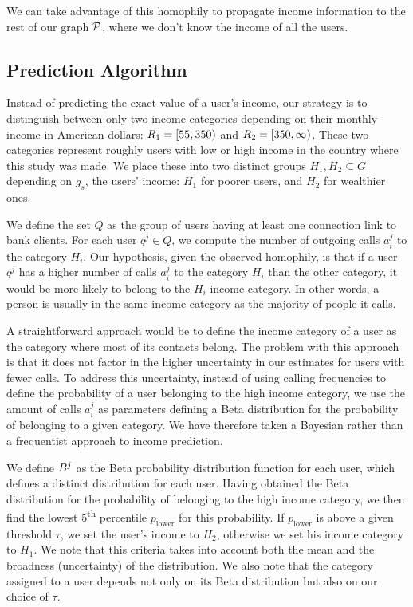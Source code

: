 We can take advantage of this homophily to propagate income information to the rest of our graph $\mathcal{P}$, where we don't know the income of all the users.

\subsection{Prediction Algorithm}

Instead of predicting the exact value of a user's income, our strategy is to distinguish between only two income categories depending on their monthly income in American dollars: $R_1 = \left[ 55, 350 \right)$ and $R_2 = \left[ 350, \infty \right)$. These two categories represent roughly users with low or high income in the country where this study was made. We place these into two distinct groups $H_1, H_2 \subseteq G$ depending on $g_s$, the users' income: $H_1$ for poorer users, and $H_2$ for wealthier ones.

We define the set $Q$ as the group of users having at least one connection link to bank clients. For each user $q^j \in Q$, we compute the number of outgoing calls $a^j_i$ to the category $H_i$. Our hypothesis, given the observed homophily, is that if a user $q^j$ has a higher number of calls $a^j_i$ to the category $H_i$ than the other category, it would be more likely to belong to the $H_i$ income category. In other words, a person is usually in the same income category as the majority of people it calls.

A straightforward approach would be to define the income category of a user as the category where most of its contacts belong. The problem with this approach is that it does not factor in the higher uncertainty in our estimates for users with fewer calls. To address this uncertainty, instead of using calling frequencies to define the probability of a user belonging to the high income category, we use the amount of calls $a^j_i$ as parameters defining a Beta distribution for the probability of belonging to a given category. We have therefore taken a Bayesian rather than a frequentist approach to income prediction.

We define $B^j$ as the Beta probability distribution function for each user, which defines a distinct distribution for each user. Having obtained the Beta distribution for the probability of belonging to the high income category, we then find the lowest 5\textsuperscript{th} percentile $p_{\operatorname{lower}}$ for this probability. If $p_{\operatorname{lower}}$ is above a given threshold $\tau$, we set the user's income to $H_2$, otherwise we set his income category to $H_1$. We note that this criteria takes into account both the mean and the broadness (uncertainty) of the distribution. We also note that the category assigned to a user depends not only on its Beta distribution but also on our choice of $\tau$.

